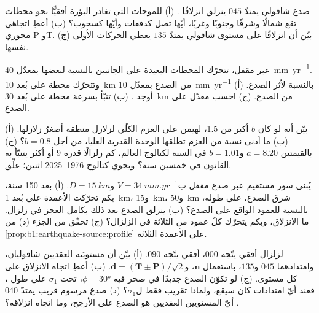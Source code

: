 \begin{exercise}[$\star\star$]\label{exo:b1:earthquake-source:8}
صدع شاقولي يمتدّ $045$ ينزلق انزلاقًا . (أ) للموجات التي تغادر البؤرة أفقيًّا نحو محطات تقع شمالًا وشرقًا وجنوبًا وغربًا، أيّها تصل كدفعات وأيّها كسحوب؟ (ب) أعطِ اتجاهي محوري P وT. (ج) بيّن أن انزلاقًا  على مستوى شاقولي يمتدّ $135$ يعطي الحركات الأولى نفسها.
\end{exercise}

\begin{exercise}[$\star\star$]\label{exo:b1:earthquake-source:9}
عبر  مقفل، تتحرّك المحطات البعيدة على الجانبين بالنسبة لبعضها بمعدّل \qty{40}{mm.yr^{-1}}. وتتحرّك محطة على بُعد \qty{10}{km} من الصدع بمعدّل \qty{10}{mm.yr^{-1}} بالنسبة لأثر الصدع. (أ) أوجد . (ب) تنبّأ بسرعة محطة على بُعد \qty{30}{km} من الصدع. (ج) احسب معدّل  على الصدع.
\end{exercise}

\begin{exercise}[$\star\star\star$]\label{exo:b1:earthquake-source:10}
(أ) بيّن أنه لو كان $b$ أكبر من 1.5، لهيمن على العزم الكلّي لزلازل منطقة أصغرُ زلازلها. (ب) ما أدنى نسبة من العزم تطلقها الوحدة القدرية العليا، من أجل $b = 0.8$؟ (ج) بالقيمتين $a = 8.20$ و$b = 1.01$ في السنة لكتالوج العالم، كم زلزالًا قدره 9 أو أكثر يتنبّأ به القانون في خمسين سنة؟ ويحوي كتالوج 1976--2025 اثنين؛ علِّق.
\end{exercise}

\begin{exercise}[$\star\star\star$]\label{exo:b1:earthquake-source:11}
يُبنى سور مستقيم عبر صدع  مقفل ب$V =
\qty{34}{mm.yr^{-1}}$ و$D = \qty{15}{km}$. (أ) بعد 150 سنة، بكم تحرّكت الأعمدة على بُعد \qty{1}{km}، و\qty{15}{km}، و\qty{50}{km} شرق الصدع، على طوله، بالنسبة للعمود الواقع على الصدع؟ (ب) ينزلق الصدع بعد ذلك بكامل العجز في زلزال. ما الانزلاق، وبكم يتحرّك كلّ عمود من الثلاثة في الزلزال؟ (ج) تحقّق من الجزء (د) من \cref{prop:b1:earthquake-source:profile} على الأعمدة الثلاثة.
\end{exercise}

\begin{exercise}[$\star\star\star$]\label{exo:b1:earthquake-source:12}
لزلزال  أفقي يتّجه $000$،  أفقي يتّجه $090$. (أ) بيّن أن مستويَيه العقديين شاقوليان، وامتدادهما $045$ و$135$، باستعمال $\mathbf n$، و$\mathbf d = (\mathbf T \pm \mathbf P)/\sqrt2$. (ب) أعطِ اتجاه الانزلاق على كل مستوى. (ج) لو تكوّن الصدع جديدًا في صخر فيه $\phi = \ang{30}$، تحت $\sigma_1$ على طول ، فعند أيّ امتدادات كان سيقع، ولماذا  تقريب فقط ل$\sigma_1$؟ (د) صدع مرسوم قريب يمتدّ $040$. أيّ المستويين العقديين هو الصدع على الأرجح، وما اتجاه انزلاقه؟
\end{exercise}

